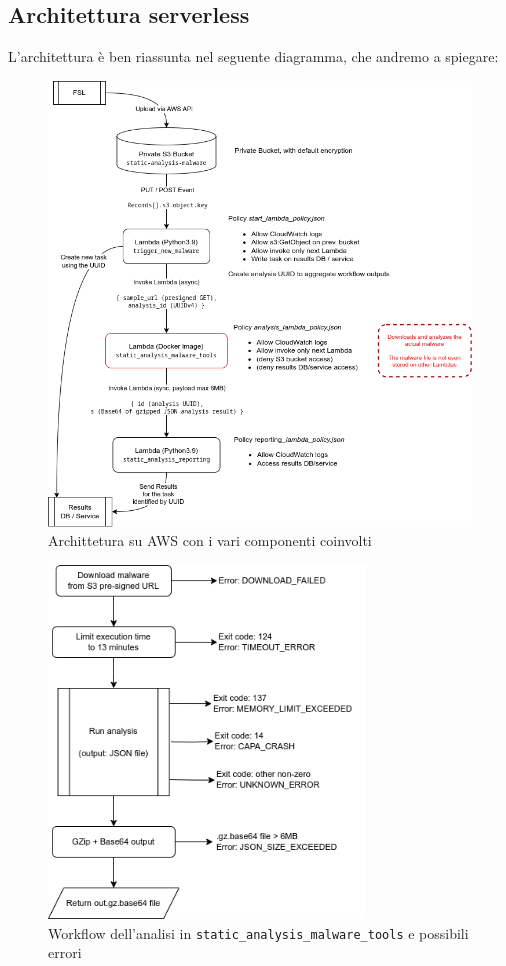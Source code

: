 \subsection{Architettura serverless}
L'architettura è ben riassunta nel seguente diagramma, che andremo a spiegare:
\begin{figure}[htbp]
    \centering
    \includegraphics[width=\textwidth]{assets/aws_static_lambdas_architecture.png}
    \caption{Archittetura su AWS con i vari componenti coinvolti}
    \label{fig:aws_static_lambdas_architecture}
\end{figure}

\begin{figure}[htbp]
    \centering
    \includegraphics[width=0.75\textwidth]{assets/docker_static_analysis_flow.png}
    \caption{Workflow dell'analisi in \texttt{static\_analysis\_malware\_tools} e possibili errori}
    \label{fig:enter-label}
\end{figure}

